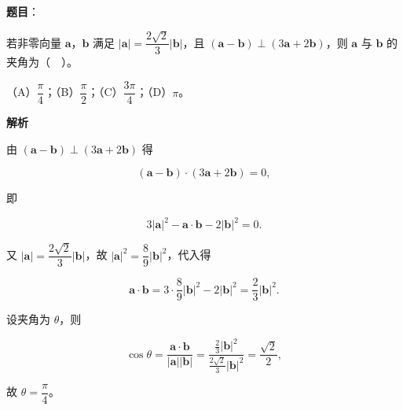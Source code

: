 \begin{answer}

\textbf{题目}：

若非零向量 $\boldsymbol{a}$，$\boldsymbol{b}$ 满足 $|\boldsymbol{a}|=\dfrac{2\sqrt{2}}{3}|\boldsymbol{b}|$，且 $(\boldsymbol{a}-\boldsymbol{b})\perp(3\boldsymbol{a}+2\boldsymbol{b})$，则 $\boldsymbol{a}$ 与 $\boldsymbol{b}$ 的夹角为（　）。

（A）$\dfrac{\pi}{4}$；（B）$\dfrac{\pi}{2}$；（C）$\dfrac{3\pi}{4}$；（D）$\pi$。

\textbf{解析}

由 $(\boldsymbol{a}-\boldsymbol{b})\perp(3\boldsymbol{a}+2\boldsymbol{b})$ 得

\nopagebreak[4]
\[
(\boldsymbol{a}-\boldsymbol{b})\cdot(3\boldsymbol{a}+2\boldsymbol{b})=0,
\]

即

\nopagebreak[4]
\[
3|\boldsymbol{a}|^{2}-\boldsymbol{a}\cdot\boldsymbol{b}-2|\boldsymbol{b}|^{2}=0.
\]

又 $|\boldsymbol{a}|=\dfrac{2\sqrt{2}}{3}|\boldsymbol{b}|$，故 $|\boldsymbol{a}|^{2}=\dfrac{8}{9}|\boldsymbol{b}|^{2}$，代入得

\nopagebreak[4]
\[
\boldsymbol{a}\cdot\boldsymbol{b}=3\cdot\frac{8}{9}|\boldsymbol{b}|^{2}-2|\boldsymbol{b}|^{2}
=\frac{2}{3}|\boldsymbol{b}|^{2}.
\]

设夹角为 $\theta$，则

\nopagebreak[4]
\[
\cos\theta=\frac{\boldsymbol{a}\cdot\boldsymbol{b}}{|\boldsymbol{a}||\boldsymbol{b}|}
=\frac{\frac{2}{3}|\boldsymbol{b}|^{2}}{\frac{2\sqrt{2}}{3}|\boldsymbol{b}|^{2}}
=\frac{\sqrt{2}}{2},
\]

故 $\theta=\dfrac{\pi}{4}$。


\end{answer}
